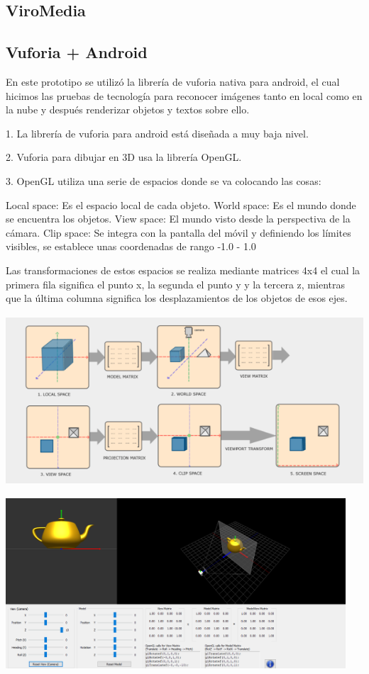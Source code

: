 \subsection{ViroMedia} 
\label{makereference3.6.2} 
 
\subsection{Vuforia + Android} 
\label{makereference3.6.3} 
 
En este prototipo se utilizó la librería de vuforia nativa para android, 
el cual hicimos las pruebas de tecnología para reconocer imágenes tanto en  
local como en la nube y después renderizar objetos y textos sobre ello.  
 
1. La librería de vuforia para android está diseñada a muy baja nivel. 

2. Vuforia para dibujar en 3D usa la librería OpenGL.

3. OpenGL utiliza una serie de espacios donde se va colocando las cosas:

Local space: Es el espacio local de cada objeto.
World space: Es el mundo donde se encuentra los objetos.
View space: El mundo visto desde la perspectiva de la cámara.
Clip space: Se integra con la pantalla del móvil y definiendo los límites 
visibles, se establece unas coordenadas de rango -1.0 - 1.0

Las transformaciones de estos espacios se realiza mediante matrices 4x4 
el cual la primera fila significa el punto x, la segunda el punto y y la 
tercera z, mientras que la última columna significa los desplazamientos 
de los objetos de esos ejes.

\includegraphics[height=2.5in]{figures/space-transformation.png}

\includegraphics[height=2.5in]{figures/teapot.png}

